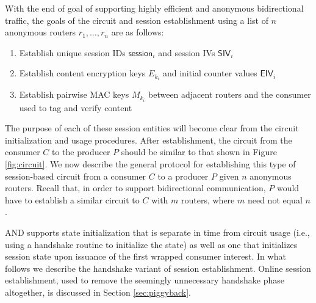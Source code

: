 With the end of goal of supporting highly efficient and anonymous bidirectional traffic, the goals of the circuit and session establishment using a list of $n$ anonymous routers $r_1,\dots,r_n$ are as follows:
\begin{enumerate}
\item Establish unique session IDs $\mathsf{session}_{i}$ and session IVs $\mathsf{SIV}_i$
\item Establish content encryption keys $E_{k_i}$ and initial counter values $\mathsf{EIV}_i$
\item Establish pairwise MAC keys $M_{k_i}$ between adjacent routers and the consumer used to tag and verify content
\end{enumerate}

The purpose of each of these session entities will become clear from the circuit initialization and usage procedures. After establishment, the circuit from the consumer $C$ to the producer $P$ should be similar to that shown in Figure \ref{fig:circuit}. We now describe the general protocol for establishing this type of session-based circuit from a consumer $C$ to a producer $P$ given $n$ anonymous routers. Recall that, in order to support bidirectional communication, $P$ would have to establish a similar circuit to $C$ with $m$ routers, where $m$ need not equal $n$. 

{\sf AND} supports state initialization that is separate in time from circuit usage (i.e., using a handshake routine to initialize the state) as well as one that initializes session state upon issuance of the first wrapped consumer interest. In what follows we describe the handshake variant of session establishment. Online session establishment, used to remove the seemingly unnecessary handshake phase altogether, is discussed in Section \ref{sec:piggyback}.

